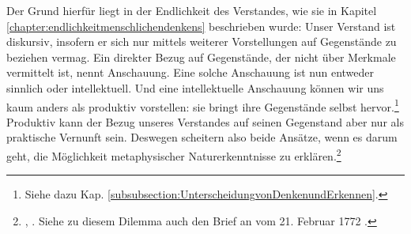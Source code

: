 \begin{nummerierung}
Der Grund hierfür liegt in der Endlichkeit des Verstandes, wie sie in Kapitel
\ref{chapter:endlichkeitmenschlichendenkens} beschrieben wurde: Unser Verstand
ist diskursiv, insofern er sich nur mittels weiterer Vorstellungen auf
Gegenstände zu beziehen vermag. Ein direkter Bezug auf Gegenstände, der nicht
über Merkmale vermittelt ist, nennt  Anschauung. Eine
solche Anschauung ist nun entweder sinnlich oder intellektuell.
Und eine intellektuelle Anschauung können wir uns kaum anders als produktiv
vorstellen: sie bringt ihre Gegenstände selbst hervor.\footnote{Siehe dazu Kap.
\ref{subsubsection:UnterscheidungvonDenkenundErkennen}.} Produktiv kann der
Bezug unseres Verstandes auf seinen Gegenstand aber nur als praktische Vernunft
sein. Deswegen scheitern also beide Ansätze, wenn es darum geht, die Möglichkeit
metaphysischer Naturerkenntnisse zu
erklären.\footnote{\cite[Vgl.][\S~14]{Kant:KritikderreinenVernunft2003},
\cite[][III: 104.6--17]{Kant:GesammelteWerke1900ff.}. Siehe zu diesem Dilemma
auch den Brief an  vom 21. Februar 1772 \parencite[][X:
124\,f.]{Kant:GesammelteWerke1900ff.}.}



\end{nummerierung}
